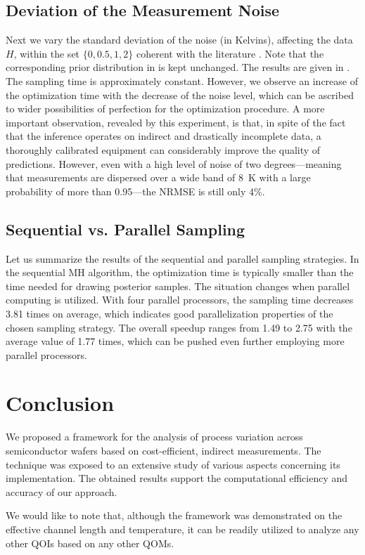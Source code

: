 \subsection{Deviation of the Measurement Noise}

Next we vary the standard deviation of the noise (in Kelvins), affecting the
data $H$, within the set $\{ 0, 0.5, 1, 2 \}$ coherent with the literature
\cite{mesa-martinez2007}. Note that the corresponding prior distribution in
 is kept unchanged. The results are given in
. The sampling time is approximately constant. However, we
observe an increase of the optimization time with the decrease of the noise
level, which can be ascribed to wider possibilities of perfection for the
optimization procedure. A more important observation, revealed by this
experiment, is that, in spite of the fact that the inference operates on
indirect and drastically incomplete data, a thoroughly calibrated equipment can
considerably improve the quality of predictions. However, even with a high level
of noise of two degrees---meaning that measurements are dispersed over a wide
band of 8~K with a large probability of more than 0.95---the NRMSE is still only
4\%.

\subsection{Sequential vs. Parallel Sampling}

Let us summarize the results of the sequential and parallel sampling strategies.
In the sequential MH algorithm, the optimization time is typically smaller than
the time needed for drawing posterior samples. The situation changes when
parallel computing is utilized. With four parallel processors, the sampling time
decreases 3.81 times on average, which indicates good parallelization properties
of the chosen sampling strategy. The overall speedup ranges from 1.49 to 2.75
with the average value of 1.77 times, which can be pushed even further employing
more parallel processors.

\section{Conclusion}

We proposed a framework for the analysis of process variation across
semiconductor wafers based on cost-efficient, indirect measurements. The
technique was exposed to an extensive study of various aspects concerning its
implementation. The obtained results support the computational efficiency and
accuracy of our approach.

We would like to note that, although the framework was demonstrated on the
effective channel length and temperature, it can be readily utilized to analyze
any other \acp{QOI} based on any other \acp{QOM}.
